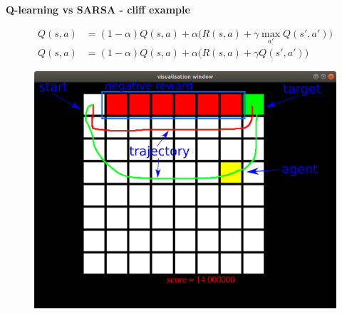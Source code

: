 \documentclass[xcolor=dvipsnames]{beamer}
\begin{document}
\begin{frame}{\bf Q-learning vs SARSA - cliff example}

\begin{align*}
Q(s, a) &= (1-\alpha)Q(s, a) + \alpha\Big(R(s, a) + \gamma \max \limits_{a'} Q(s', a')\Big) \\
Q(s, a) &= (1-\alpha)Q(s, a) + \alpha\Big(R(s, a) + \gamma Q(s', a')\Big)
\end{align*}


\begin{figure}
  \includegraphics[scale=0.35]{../../diagrams/cliff_diagram.png}
\end{figure}

\end{frame}
\end{document}
